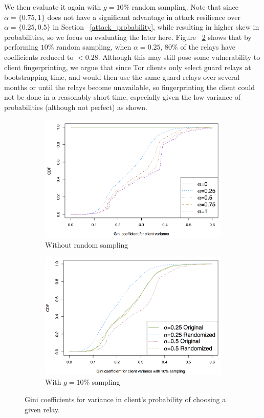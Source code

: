 We then evaluate it again with $g=10\%$ random sampling. Note that since $\alpha=\{0.75,1\}$ does not have a significant advantage in attack resilience over $\alpha=\{0.25,0.5\}$ in Section ~\ref{attack_probability}, while resulting in higher skew in probabilities, so we focus on evaluating the later here. Figure ~\ref{fig_gini_client_random} shows that by performing $10\%$ random sampling, when $\alpha=0.25$, $80\%$ of the relays have coefficients reduced to $< 0.28$. Although this may still pose some vulnerability to client fingerprinting, we argue that since Tor clients only select guard relays at bootstrapping time, and would then use the same guard relays over several months or until the relays become unavailable, so fingerprinting the client could not be done in a reasonably short time, especially given the low variance of probabilities (although not perfect) as shown.


\begin{figure}[ht!]
\centering
\begin{subfigure}{.25\textwidth}
\centering
\includegraphics[width=.9\linewidth]{figure/gini_client_variance}
\caption{Without random sampling \label{fig_gini_client}}
\end{subfigure}%
\begin{subfigure}{.25\textwidth}
\centering
\includegraphics[width=.9\linewidth]{figure/randomize_client_gini}
\caption{With $g=10\%$ sampling \label{fig_gini_client_random}}
\end{subfigure}
\caption{Gini coefficients for variance in client's probability of choosing a given relay.}
\label{fig:gini_client}
\end{figure}

